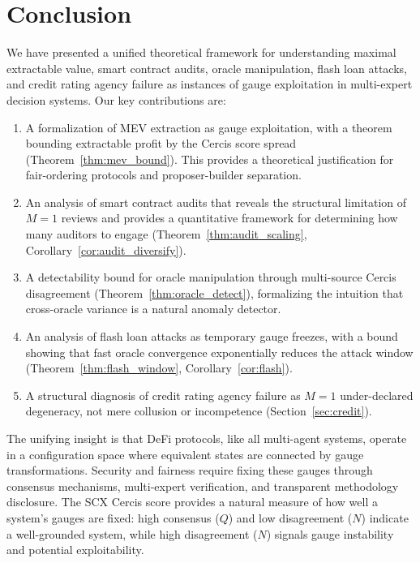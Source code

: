 \documentclass[12pt,a4paper]{article}
\theoremstyle{remark}
\newcommand{\Cercis}{\textsf{Cercis}}
\begin{document}
\section{Conclusion}
\label{sec:conclusion}

We have presented a unified theoretical framework for understanding maximal
extractable value, smart contract audits, oracle manipulation, flash loan
attacks, and credit rating agency failure as instances of gauge exploitation
in multi-expert decision systems. Our key contributions are:

\begin{enumerate}
\item A formalization of MEV extraction as gauge exploitation, with a theorem
bounding extractable profit by the \Cercis{} score spread
(Theorem~\ref{thm:mev_bound}). This provides a theoretical justification for
fair-ordering protocols and proposer-builder separation.

\item An analysis of smart contract audits that reveals the structural
limitation of $M=1$ reviews and provides a quantitative framework for
determining how many auditors to engage (Theorem~\ref{thm:audit_scaling},
Corollary~\ref{cor:audit_diversify}).

\item A detectability bound for oracle manipulation through multi-source
\Cercis{} disagreement (Theorem~\ref{thm:oracle_detect}), formalizing the
intuition that cross-oracle variance is a natural anomaly detector.

\item An analysis of flash loan attacks as temporary gauge freezes, with a
bound showing that fast oracle convergence exponentially reduces the attack
window (Theorem~\ref{thm:flash_window}, Corollary~\ref{cor:flash}).

\item A structural diagnosis of credit rating agency failure as $M=1$
under-declared degeneracy, not mere collusion or incompetence
(Section~\ref{sec:credit}).
\end{enumerate}

The unifying insight is that DeFi protocols, like all multi-agent systems,
operate in a configuration space where equivalent states are connected by
gauge transformations. Security and fairness require fixing these gauges
through consensus mechanisms, multi-expert verification, and transparent
methodology disclosure. The SCX \Cercis{} score provides a natural measure of
how well a system's gauges are fixed: high consensus ($Q$) and low disagreement
($N$) indicate a well-grounded system, while high disagreement ($N$) signals
gauge instability and potential exploitability.
\end{document}
